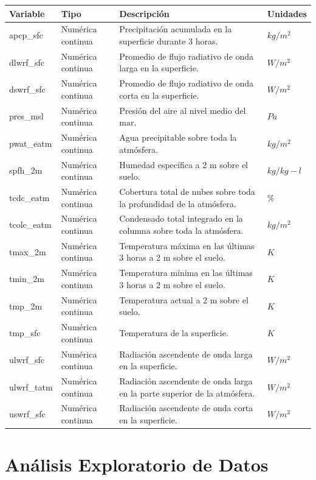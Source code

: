 \documentclass[
  11pt,
  a4paper,
]{article}
\begin{document}
\begin{landscape}
\begin{longtable}[c]{llll}
\hline
\textbf{Variable}           & \textbf{Tipo}          & \textbf{Descripción}      &\textbf{Unidades}                                   \\ \hline
\endhead
%
\hline
\endfoot
%
\endlastfoot
%
apcp\_sfc & Numérica continua & Precipitación acumulada en la superficie durante 3 horas. & $kg/m^2$ \\
dlwrf\_sfc & Numérica continua & Promedio de flujo radiativo de onda larga en la superficie. & $W/m^2$ \\
dswrf\_sfc & Numérica continua & Promedio de flujo radiativo de onda corta en la superficie. & $W/m^2$ \\
pres\_msl & Numérica continua & Presión del aire al nivel medio del mar. & $Pa$ \\
pwat\_eatm & Numérica continua & Agua precipitable sobre toda la atmósfera. & $kg/m^2$ \\
spfh\_2m & Numérica continua & Humedad específica a 2 m sobre el suelo. & $kg/kg-l$ \\
tcdc\_eatm & Numérica continua & Cobertura total de nubes sobre toda la profundidad de la atmósfera. & $\%$ \\
tcolc\_eatm & Numérica continua & Condensado total integrado en la columna sobre toda la atmósfera. & $kg/m^2$ \\
tmax\_2m & Numérica continua & Temperatura máxima en las últimas 3 horas a 2 m sobre el suelo. & $K$ \\
tmin\_2m & Numérica continua & Temperatura mínima en las últimas 3 horas a 2 m sobre el suelo. & $K$ \\
tmp\_2m & Numérica continua & Temperatura actual a 2 m sobre el suelo. & $K$ \\
tmp\_sfc & Numérica continua & Temperatura de la superficie. & $K$ \\
ulwrf\_sfc & Numérica continua & Radiación ascendente de onda larga en la superficie. & $W/m^2$ \\
ulwrf\_tatm & Numérica continua & Radiación ascendente de onda larga en la parte superior de la atmósfera. & $W/m^2$ \\
uswrf\_sfc & Numérica continua & Radiación ascendente de onda corta en la superficie. & $W/m^2$ \\
\end{longtable}
\end{landscape}

\section{Análisis Exploratorio de Datos}
\end{document}
